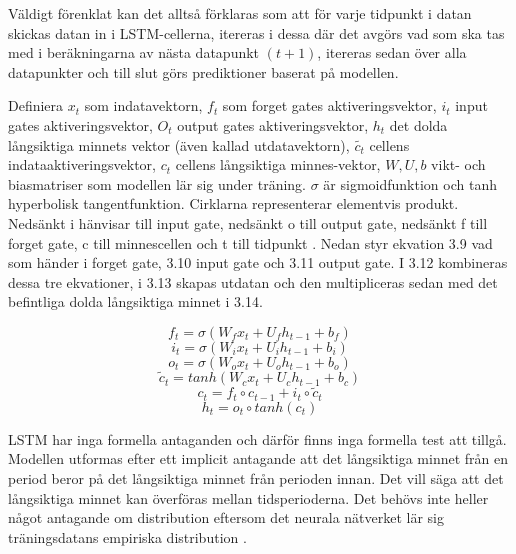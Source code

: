 \documentclass[11pt]{article}
\numberwithin{equation}{section}
\numberwithin{table}{section}
\numberwithin{figure}{section}
\begin{document}
Väldigt förenklat kan det alltså förklaras som  att för varje tidpunkt i datan skickas datan in i LSTM-cellerna, itereras i dessa där det avgörs vad som ska tas med i beräkningarna av nästa datapunkt $(t+1)$, itereras sedan över alla datapunkter och till slut görs prediktioner baserat på modellen. 

Definiera \(x_t\) som indatavektorn, \(f_t\) som forget gates aktiveringsvektor, \(i_t\) input gates aktiveringsvektor, \(O_t\) output gates aktiveringsvektor, \(h_t\) det dolda långsiktiga minnets vektor (även kallad utdatavektorn), \(\tilde{c_t}\) cellens indataaktiveringsvektor, \(c_t\) cellens långsiktiga minnes-vektor, \(W, U, b\) vikt- och biasmatriser som modellen lär sig under träning. \(\sigma\) är sigmoidfunktion och tanh hyperbolisk tangentfunktion. Cirklarna representerar elementvis produkt. Nedsänkt i hänvisar till input gate, nedsänkt o till output gate, nedsänkt f till forget gate, c till minnescellen och t till tidpunkt \parencite[][,s.478-559]{purkait2019hands}. Nedan styr ekvation 3.9 vad som händer i forget gate, 3.10 input gate och 3.11 output gate. I 3.12 kombineras dessa tre ekvationer, i 3.13 skapas utdatan och den multipliceras sedan med det befintliga dolda långsiktiga minnet i 3.14.

\begin{equation}f_t = \sigma(W_f x_t + U_f h_{t-1} + b_f)\end{equation}
\begin{equation}i_t = \sigma(W_i x_t + U_i h_{t-1} + b_i)\end{equation}
\begin{equation}o_t = \sigma(W_o x_t + U_o h_{t-1} + b_o)\end{equation}
\begin{equation}\tilde{c}_t = tanh(W_c x_t + U_c h_{t-1} + b_c)\end{equation}
\begin{equation}c_t= f_t \circ c_{t-1} + i_t \circ \tilde{c}_t\end{equation}
\begin{equation}h_t= o_t \circ tanh(c_t)\end{equation}

LSTM har inga formella antaganden och därför finns inga formella test att tillgå. Modellen utformas efter ett implicit antagande att det långsiktiga minnet från en period beror på det långsiktiga minnet från perioden innan. Det vill säga att det långsiktiga minnet kan överföras mellan tidsperioderna. Det behövs inte heller något antagande om distribution eftersom det neurala nätverket lär sig träningsdatans empiriska distribution \parencite[][,s.478-559]{purkait2019hands}.
\end{document}
